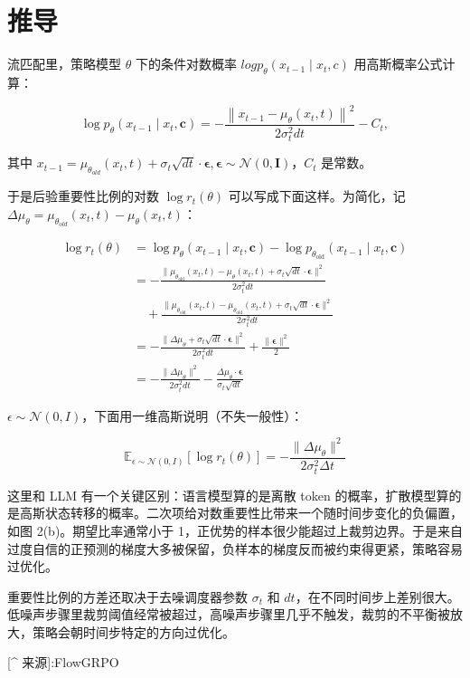 \section{推导}

流匹配里，策略模型 \(θ\) 下的条件对数概率 \(logp_θ(x_{t−1}∣x_t,c)\) 用高斯概率公式计算：

\[
\log p _ {\theta} \left(x _ {t - 1} \mid x _ {t}, \boldsymbol {c}\right) = - \frac {\left\| x _ {t - 1} - \mu_ {\theta} \left(x _ {t} , t\right) \right\| ^ {2}}{2 \sigma_ {t} ^ {2} d t} - C _ {t}, \tag {6}
\]

其中 \(x_{t - 1} = \mu_{\theta_{old}}(x_t,t) + \sigma_t\sqrt{dt}\cdot \pmb {\epsilon},\pmb {\epsilon}\sim \mathcal{N}(0,\pmb {I})\)，\(C_t\) 是常数。

于是后验重要性比例的对数 \(\log r_t(\theta)\) 可以写成下面这样。为简化，记 \(\Delta \mu_{\theta} = \mu_{\theta_{old}}(x_t,t) - \mu_{\theta}(x_t,t)\)：

\begin{align}
\log r_t(\theta)
&= \log p_{\theta}(x_{t-1} \mid x_t, \boldsymbol{c})
 - \log p_{\theta_{\text{old}}}(x_{t-1} \mid x_t, \boldsymbol{c}) \\
&= - \frac{\| \mu_{\theta_{\text{old}}}(x_t, t) - \mu_{\theta}(x_t, t) + \sigma_t \sqrt{dt}\cdot \boldsymbol{\epsilon} \|^2}{2 \sigma_t^2 dt} \\
&\quad + \frac{\| \mu_{\theta_{\text{old}}}(x_t, t) - \mu_{\theta_{\text{old}}}(x_t, t) + \sigma_t \sqrt{dt}\cdot \boldsymbol{\epsilon} \|^2}{2 \sigma_t^2 dt} \\
&= - \frac{\| \Delta \mu_\theta + \sigma_t \sqrt{dt}\cdot \boldsymbol{\epsilon} \|^2}{2 \sigma_t^2 dt}
 + \frac{\| \boldsymbol{\epsilon} \|^2}{2} \\
&= - \frac{\| \Delta \mu_\theta \|^2}{2 \sigma_t^2 dt}
 - \frac{\Delta \mu_\theta \cdot \boldsymbol{\epsilon}}{\sigma_t \sqrt{dt}}
\tag{7}
\end{align}

\(\epsilon \sim \mathcal{N}(0,I)\)，下面用一维高斯说明（不失一般性）：

\[
\mathbb{E}_{\epsilon \sim \mathcal{N}(0,I)}[\log r_t(\theta)] = -\frac{\|\Delta\mu_\theta\|^2}{2\sigma_t^2\Delta t}
\]

这里和 LLM 有一个\colorbox{mdc2}{\textcolor{mdc1}{关键区别}}：语言模型算的是离散 token 的概率，扩散模型算的是高斯状态转移的概率。\colorbox{mdc2}{\textcolor{mdc1}{二次项给对数重要性比带来一个随时间步变化的负偏置}}，如图 2(b)。期望比率通常小于 1，正优势的样本很少能超过上裁剪边界。于是来自过度自信的正预测的梯度大多被保留，负样本的梯度反而被约束得更紧，策略容易过优化。

重要性比例的方差还取决于去噪调度器参数 \(\sigma_t\) 和 \(dt\)，在不同时间步上差别很大。低噪声步骤里裁剪阈值经常被超过，高噪声步骤里几乎不触发，裁剪的不平衡被放大，策略会朝时间步特定的方向过优化。

[\textasciicircum{} 来源]:FlowGRPO

